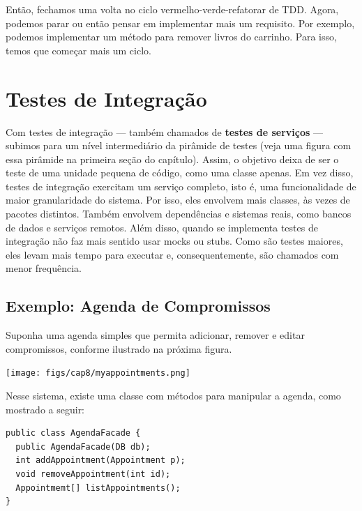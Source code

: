 \documentclass[
  11pt,
  twoside]{book}
\let\origfigure\figure
\let\endorigfigure\endfigure
\renewenvironment{figure}[1][2] {
    \expandafter\origfigure\expandafter[!h]
} {
    \endorigfigure
}
\begin{document}
Então, fechamos uma volta no ciclo vermelho-verde-refatorar de TDD.
Agora, podemos parar ou então pensar em implementar mais um requisito.
Por exemplo, podemos implementar um método para remover livros do
carrinho. Para isso, temos que começar mais um ciclo.

\hypertarget{testes-de-integrauxe7uxe3o}{%
\section{Testes de Integração}\label{testes-de-integrauxe7uxe3o}}


Com testes de integração --- também chamados de \textbf{testes de
serviços} --- subimos para um nível intermediário da pirâmide de testes
(veja uma figura com essa pirâmide na primeira seção do capítulo).
Assim, o objetivo deixa de ser o teste de uma unidade pequena de código,
como uma classe apenas. Em vez disso, testes de integração exercitam um
serviço completo, isto é, uma funcionalidade de maior granularidade do
sistema. Por isso, eles envolvem mais classes, às vezes de pacotes
distintos. Também envolvem dependências e sistemas reais, como bancos de
dados e serviços remotos. Além disso, quando se implementa testes de
integração não faz mais sentido usar mocks ou stubs. Como são testes
maiores, eles levam mais tempo para executar e, consequentemente, são
chamados com menor frequência.

\hypertarget{exemplo-agenda-de-compromissos}{%
\subsection{Exemplo: Agenda de
Compromissos}\label{exemplo-agenda-de-compromissos}}

Suponha uma agenda simples que permita adicionar, remover e editar
compromissos, conforme ilustrado na próxima figura.

\begin{figure}
\centering
\texttt{[image: figs/cap8/myappointments.png]}
\caption{Interface da Agenda de Compromissos}
\end{figure}

Nesse sistema, existe uma classe com métodos para manipular a agenda,
como mostrado a seguir:

\begin{lstlisting}
public class AgendaFacade {
  public AgendaFacade(DB db);
  int addAppointment(Appointment p);
  void removeAppointment(int id);
  Appointmemt[] listAppointments();
}
\end{lstlisting}
\end{document}
